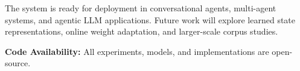\documentclass[10pt,twocolumn,letterpaper]{article}
\begin{document}
The system is ready for deployment in conversational agents, multi-agent systems, and agentic LLM applications. Future work will explore learned state representations, online weight adaptation, and larger-scale corpus studies.

\textbf{Code Availability:} All experiments, models, and implementations are open-source.



\end{document}
